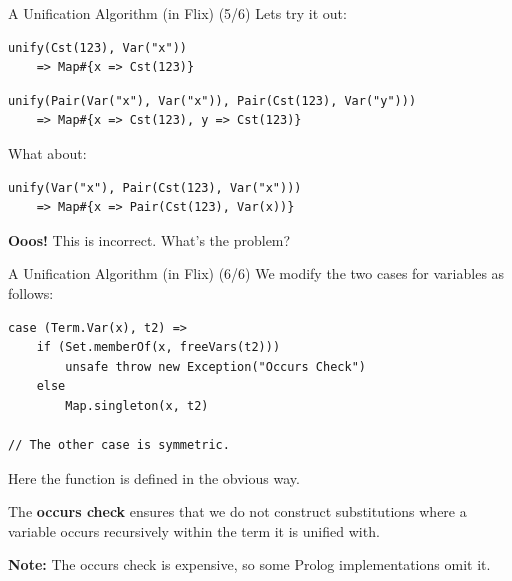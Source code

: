 \begin{frame}[fragile]{A Unification Algorithm (in Flix) (5/6)}
Lets try it out: 

\begin{lstlisting}[language=flix, xleftmargin=0.5cm]
unify(Cst(123), Var("x")) 
    => Map#{x => Cst(123)}
\end{lstlisting}

\pause 

\begin{lstlisting}[language=flix, xleftmargin=0.5cm]
unify(Pair(Var("x"), Var("x")), Pair(Cst(123), Var("y"))) 
    => Map#{x => Cst(123), y => Cst(123)}
\end{lstlisting}

\pause 

What about:

\begin{lstlisting}[language=flix, xleftmargin=0.5cm]
unify(Var("x"), Pair(Cst(123), Var("x")))
    => Map#{x => Pair(Cst(123), Var(x))}
\end{lstlisting}

\pause 

\textbf{Ooos!} This is incorrect. What's the problem?

\end{frame}

\begin{frame}[fragile]{A Unification Algorithm (in Flix) (6/6)}
We modify the two cases for variables as follows: 

\begin{lstlisting}[language=flix, xleftmargin=0.5cm]
case (Term.Var(x), t2) => 
    if (Set.memberOf(x, freeVars(t2)))
        unsafe throw new Exception("Occurs Check") 
    else 
        Map.singleton(x, t2)

// The other case is symmetric.
\end{lstlisting}

Here the  function is defined in the obvious way.

The \textbf{occurs check} ensures that we do not construct substitutions where a
variable occurs recursively within the term it is unified with. 

\pause

\textbf{Note:} The occurs check is expensive, so some Prolog implementations omit it.
\end{frame}  

